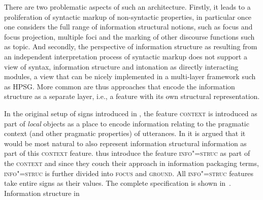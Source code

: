 \documentclass[output=paper,biblatex,babelshorthands,newtxmath,draftmode,colorlinks,citecolor=brown]{langscibook}
\begin{document}
There are two problematic aspects of such an architecture. Firstly, it
leads to a proliferation of syntactic markup of non-syntactic
properties, in particular once one considers the full range of
information structural notions, such as focus and focus projection,
multiple foci and the marking of other discourse functions such as
topic. And secondly, the perspective of information structure as
resulting from an independent interpretation process of syntactic
markup does not support a view of syntax, information structure and
intonation as directly interacting modules, a view that can be nicely
implemented in a multi-layer framework such as HPSG.
More common are thus approaches that encode the information structure
as a separate layer, i.e., a feature with its own structural
representation.

In the original setup of signs introduced in , the feature
\textsc{context} is introduced as part of \textit{local} objects as a
place to encode information relating to the pragmatic context (and
other pragmatic properties) of utterances. In  it is
argued that it would be most natural to also represent information
structural information as part of this \textsc{context}
feature. \citet{EV96a} thus introduce the feature \textsc{info"=struc}
as part of the \textsc{context} and since they couch their
approach in  information packaging terms,
\textsc{info"=struc} is further divided into \textsc{focus} and
\textsc{ground}. All \textsc{info"=struc} features take entire signs as
their values. The complete specification is shown \mbox{in .}
\ea \label{fig:e-v-info-struc}
Information structure in 
        \leavevmode
{}
\z
\end{document}
